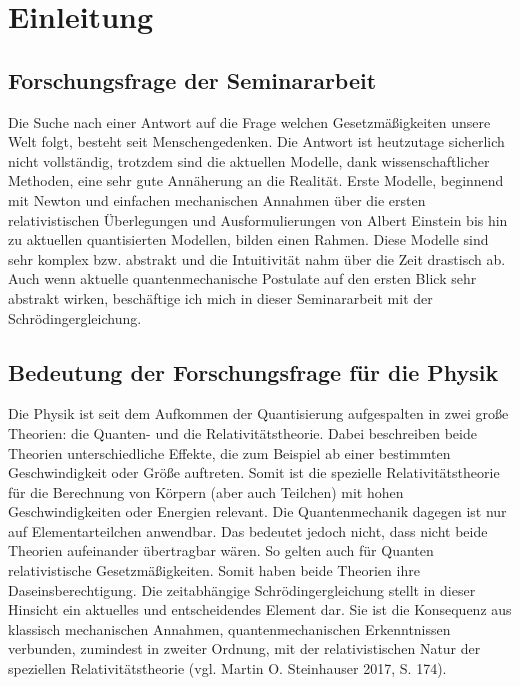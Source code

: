 \documentclass[12pt,oneside, a4paper]{scrbook}
\begin{document}
\begin{titlepage} 

% 

\end{titlepage}

\tableofcontents
\thispagestyle{empty}

\newpage

\chapter{Einleitung}

\section{Forschungsfrage der Seminararbeit}

Die Suche nach einer Antwort auf die Frage welchen Gesetzmäßigkeiten unsere Welt folgt, besteht seit Menschengedenken. Die Antwort ist heutzutage sicherlich nicht vollständig, trotzdem sind die aktuellen Modelle, dank wissenschaftlicher Methoden, eine sehr gute Annäherung an die Realität. Erste Modelle, beginnend mit Newton und einfachen mechanischen Annahmen über die ersten relativistischen Überlegungen und Ausformulierungen von Albert Einstein bis hin zu aktuellen quantisierten Modellen, bilden einen Rahmen. Diese Modelle sind sehr komplex bzw. abstrakt und die Intuitivität nahm über die Zeit drastisch ab. Auch wenn aktuelle quantenmechanische Postulate auf den ersten Blick sehr abstrakt wirken, beschäftige ich mich in dieser Seminararbeit mit der Schrödingergleichung.

\section{Bedeutung der Forschungsfrage für die Physik}

Die Physik ist seit dem Aufkommen der Quantisierung aufgespalten in zwei große Theorien: die Quanten- und die Relativitätstheorie. Dabei beschreiben beide Theorien unterschiedliche Effekte, die zum Beispiel ab einer bestimmten Geschwindigkeit oder Größe auftreten. Somit ist die spezielle Relativitätstheorie für die Berechnung von Körpern (aber auch Teilchen) mit hohen Geschwindigkeiten oder Energien relevant. Die Quantenmechanik dagegen ist nur auf Elementarteilchen anwendbar. Das bedeutet jedoch nicht, dass nicht beide Theorien aufeinander übertragbar wären. So gelten auch für Quanten relativistische Gesetzmäßigkeiten. Somit haben beide Theorien ihre Daseinsberechtigung. Die zeitabhängige Schrödingergleichung stellt in dieser Hinsicht ein aktuelles und entscheidendes Element dar. Sie ist die Konsequenz aus klassisch mechanischen Annahmen, quantenmechanischen Erkenntnissen verbunden, zumindest in zweiter Ordnung, mit der relativistischen Natur der speziellen Relativitätstheorie (vgl. Martin O. Steinhauser 2017, S. 174).
\end{document}
